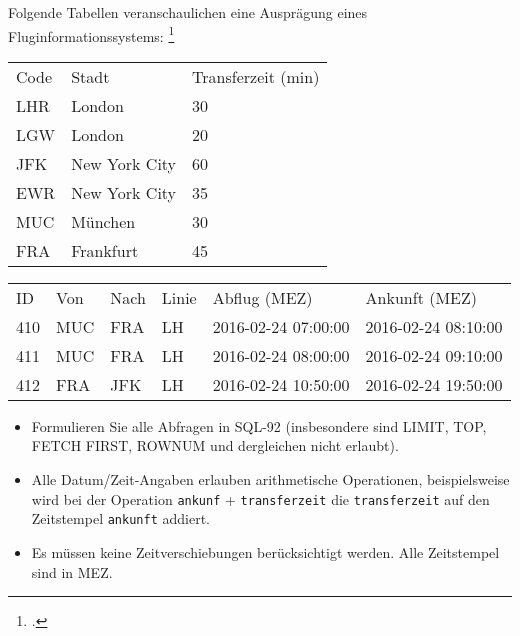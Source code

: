 \documentclass{bschlangaul-aufgabe}
\begin{document}

Folgende Tabellen veranschaulichen eine Ausprägung eines Fluginformationssystems:
\footcite{examen:66116:2017:09}


\begin{tabular}{lll}
Code &
Stadt &
Transferzeit (min)\\

LHR &
London &
30\\

LGW &
London &
20\\

JFK &
New York City &
60\\

EWR &
New York City &
35\\

MUC &
München &
30\\

FRA &
Frankfurt &
45\\
\end{tabular}


\begin{tabular}{llllll}
ID &
Von &
Nach &
Linie &
Abflug (MEZ) &
Ankunft (MEZ)\\

410 &
MUC &
FRA &
LH &
2016-02-24 07:00:00 &
2016-02-24 08:10:00\\

411 &
MUC &
FRA &
LH &
2016-02-24 08:00:00 &
2016-02-24 09:10:00\\

412 &
FRA &
JFK &
LH &
2016-02-24 10:50:00 &
2016-02-24 19:50:00 \\
\end{tabular}


\begin{itemize}
\item Formulieren Sie alle Abfragen in SQL-92 (insbesondere sind
LIMIT, TOP, FETCH FIRST, ROWNUM und dergleichen nicht erlaubt).

\item Alle Datum/Zeit-Angaben erlauben arithmetische Operationen,
beispielsweise wird bei der Operation \texttt{ankunf} +
\texttt{transferzeit} die \texttt{transferzeit} auf den Zeitstempel
\texttt{ankunft} addiert.

\item Es müssen keine Zeitverschiebungen berücksichtigt werden. Alle
Zeitstempel sind in MEZ.
\end{itemize}
\end{document}
